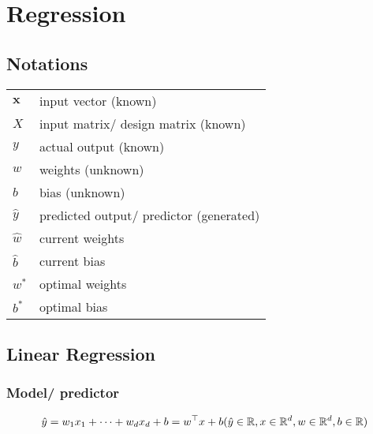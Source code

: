 \chapter{Regression}

\section*{Notations}

\begin{table}[H]
    \begin{tabular}{l l}
        $\mathbf{x}$ & input vector (known) \\

        $X$ & input matrix/ design matrix (known) \\
        
        $y$ & actual output (known) \\

        $w$ & weights (unknown) \\

        $b$ & bias (unknown) \\

        $\hat{y}$ & predicted output/ predictor (generated) \\

        $\hat{w}$ & current weights \\

        $\hat{b}$ & current bias \\

        $w^\ast$ & optimal weights \\

        $b^\ast$ & optimal bias \\
    \end{tabular}
\end{table}

\section{Linear Regression \cite{dnn-1}} \label{Linear Regression}

\subsection{Model/ predictor}
\[
    \hfill
    \hat{y} = w_1x_1 + \cdots + w_dx_d + b
    = w^\top x + b
    \hfill
    (
        \hat{y} \in \mathbb{R},
        x \in \mathbb{R}^d ,
        w \in \mathbb{R}^d,
        b \in \mathbb{R}
    )
\]
    


